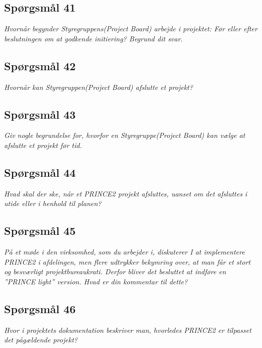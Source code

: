 \documentclass[12pt,twoside]{article}
\begin{document}
    \subsection{Spørgsmål 41}
    \textit{Hvornår begynder Styregruppens(Project Board) arbejde i projektet: Før eller efter beslutningen om at godkende initiering? Begrund dit svar.}
    \subsection{Spørgsmål 42}
    \textit{Hvornår kan Styregruppen(Project Board) afslutte et projekt?}
    \subsection{Spørgsmål 43}
    \textit{Giv nogle begrundelse for, hvorfor en Styregruppe(Project Board) kan vælge at afslutte et projekt før tid.}
    \subsection{Spørgsmål 44}
    \textit{Hvad skal der ske, når et PRINCE2 projekt afsluttes, uanset om det afsluttes i utide eller i henhold til planen?}
    \subsection{Spørgsmål 45}
    \textit{På et møde i den virksomhed, som du arbejder i, diskuterer I at implementere PRINCE2 i afdelingen, men flere udtrykker bekymring over, at man får et stort og besværligt projektbureaukrati. Derfor bliver det besluttet at indføre en ”PRINCE light” version. Hvad er din kommentar til dette?}
    \subsection{Spørgsmål 46}
    \textit{Hvor i projektets dokumentation beskriver man, hvorledes PRINCE2 er tilpasset det pågældende projekt?}
\end{document}
